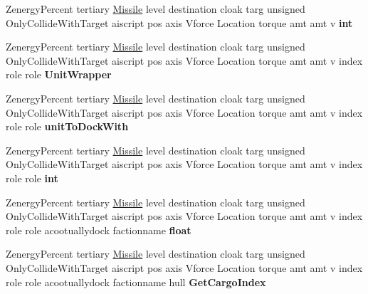 \begin{DoxyCompactItemize}
\item 
Zenergy\+Percent tertiary \hyperlink{classMissile}{Missile} level destination cloak targ unsigned Only\+Collide\+With\+Target aiscript pos axis Vforce Location torque amt amt v {\bfseries int}\hypertarget{classUnitWrapper_abda0d5d9a72b96e3b3a4aa5bbb26b011}{}\label{classUnitWrapper_abda0d5d9a72b96e3b3a4aa5bbb26b011}

\item 
Zenergy\+Percent tertiary \hyperlink{classMissile}{Missile} level destination cloak targ unsigned Only\+Collide\+With\+Target aiscript pos axis Vforce Location torque amt amt v index role role {\bfseries Unit\+Wrapper}\hypertarget{classUnitWrapper_a2863f51335ff9014d9872c4cdc183352}{}\label{classUnitWrapper_a2863f51335ff9014d9872c4cdc183352}

\item 
Zenergy\+Percent tertiary \hyperlink{classMissile}{Missile} level destination cloak targ unsigned Only\+Collide\+With\+Target aiscript pos axis Vforce Location torque amt amt v index role role {\bfseries unit\+To\+Dock\+With}\hypertarget{classUnitWrapper_a3a838692f5e6a66f2813a53e401dc317}{}\label{classUnitWrapper_a3a838692f5e6a66f2813a53e401dc317}

\item 
Zenergy\+Percent tertiary \hyperlink{classMissile}{Missile} level destination cloak targ unsigned Only\+Collide\+With\+Target aiscript pos axis Vforce Location torque amt amt v index role role {\bfseries int}\hypertarget{classUnitWrapper_a8ead82fa99cf1c36152342483af356d6}{}\label{classUnitWrapper_a8ead82fa99cf1c36152342483af356d6}

\item 
Zenergy\+Percent tertiary \hyperlink{classMissile}{Missile} level destination cloak targ unsigned Only\+Collide\+With\+Target aiscript pos axis Vforce Location torque amt amt v index role role acootuallydock factionname {\bfseries float}\hypertarget{classUnitWrapper_a91c057455afb6e9dfb503599c67778c7}{}\label{classUnitWrapper_a91c057455afb6e9dfb503599c67778c7}

\item 
Zenergy\+Percent tertiary \hyperlink{classMissile}{Missile} level destination cloak targ unsigned Only\+Collide\+With\+Target aiscript pos axis Vforce Location torque amt amt v index role role acootuallydock factionname hull {\bfseries Get\+Cargo\+Index}\hypertarget{classUnitWrapper_a942c95d9e1ee13eebd0d98c41afd3bcb}{}\label{classUnitWrapper_a942c95d9e1ee13eebd0d98c41afd3bcb}


\end{DoxyCompactItemize}
